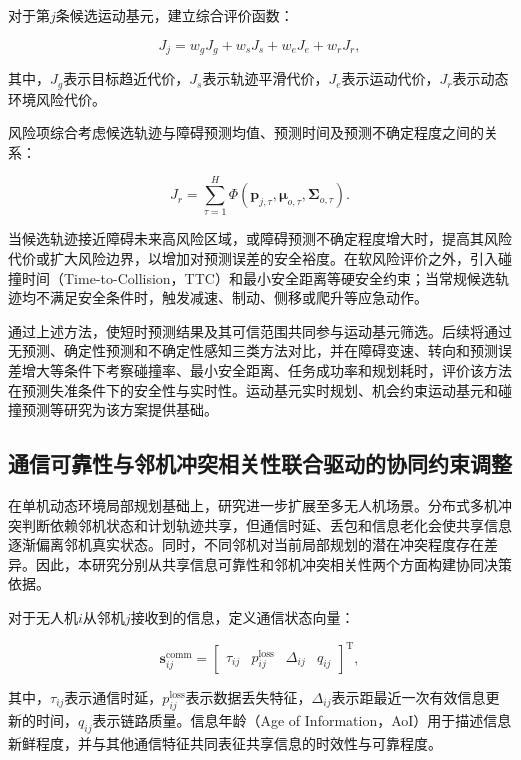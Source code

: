 对于第$j$条候选运动基元，建立综合评价函数：

\begin{equation}
J_j=w_gJ_g+w_sJ_s+w_eJ_e+w_rJ_r,
\end{equation}

其中，$J_g$表示目标趋近代价，$J_s$表示轨迹平滑代价，$J_e$表示运动代价，$J_r$表示动态环境风险代价。

风险项综合考虑候选轨迹与障碍预测均值、预测时间及预测不确定程度之间的关系：

\begin{equation}
J_r=\sum_{\tau=1}^{H}\Phi\left(\mathbf{p}_{j,\tau},\boldsymbol{\mu}_{o,\tau},\boldsymbol{\Sigma}_{o,\tau}\right).
\end{equation}

当候选轨迹接近障碍未来高风险区域，或障碍预测不确定程度增大时，提高其风险代价或扩大风险边界，以增加对预测误差的安全裕度。在软风险评价之外，引入碰撞时间（Time-to-Collision，TTC）和最小安全距离等硬安全约束；当常规候选轨迹均不满足安全条件时，触发减速、制动、侧移或爬升等应急动作。

通过上述方法，使短时预测结果及其可信范围共同参与运动基元筛选。后续将通过无预测、确定性预测和不确定性感知三类方法对比，并在障碍变速、转向和预测误差增大等条件下考察碰撞率、最小安全距离、任务成功率和规划耗时，评价该方法在预测失准条件下的安全性与实时性。运动基元实时规划、机会约束运动基元和碰撞预测等研究为该方案提供基础\cite{primitiveSwarm,gutow2020koopman,nguyen2022collision}。

\subsection{通信可靠性与邻机冲突相关性联合驱动的协同约束调整}

在单机动态环境局部规划基础上，研究进一步扩展至多无人机场景。分布式多机冲突判断依赖邻机状态和计划轨迹共享，但通信时延、丢包和信息老化会使共享信息逐渐偏离邻机真实状态。同时，不同邻机对当前局部规划的潜在冲突程度存在差异。因此，本研究分别从共享信息可靠性和邻机冲突相关性两个方面构建协同决策依据。

对于无人机$i$从邻机$j$接收到的信息，定义通信状态向量：

\begin{equation}
\mathbf{s}^{\mathrm{comm}}_{ij}=\begin{bmatrix}\tau_{ij} & p^{\mathrm{loss}}_{ij} & \Delta_{ij} & q_{ij}\end{bmatrix}^{\mathrm T},
\end{equation}

其中，$\tau_{ij}$表示通信时延，$p^{\mathrm{loss}}_{ij}$表示数据丢失特征，$\Delta_{ij}$表示距最近一次有效信息更新的时间，$q_{ij}$表示链路质量。信息年龄（Age of Information，AoI）用于描述信息新鲜程度，并与其他通信特征共同表征共享信息的时效性与可靠程度\cite{hu2024aoi}。

